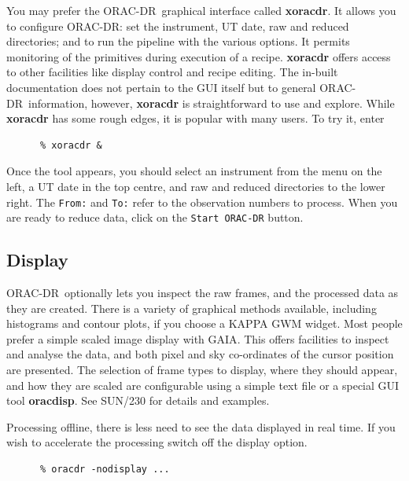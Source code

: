 \documentclass[twoside,11pt]{article}
\newcommand{\htmlref}[2]{#1}
\newcommand{\xref}[3]{#1}
\newcommand{\xlabel}[1]{}
\renewcommand{\_}{\texttt{\symbol{95}}}
\newcommand{\GAIA}{{\footnotesize GAIA}}
\newcommand{\KAPPA}{{\footnotesize KAPPA}}
\newcommand{\ORACDR}{{\footnotesize ORAC-DR}}
\begin{document}
You may prefer the \ORACDR\ graphical interface called 
\xref{{\bf xoracdr}}{sun230}{xoracdr}.
  It allows you to configure
ORAC-DR: set the instrument, UT date, raw and reduced directories; and
to run the pipeline with the various options.  It permits monitoring
of the primitives during execution of a recipe. {\bf xoracdr} offers
access to other facilities like
\htmlref{display control}{display} and recipe editing.  The in-built
documentation does not pertain to the GUI itself but to general
\ORACDR\ information, however, {\bf xoracdr} is straightforward to use
and explore.  While {\bf xoracdr} has some rough edges, it is popular
with many users.  To try it, enter

\begin{verbatim}
      % xoracdr &
\end{verbatim}

Once the tool appears, you should select an instrument from the menu on
the left, a UT date in the top centre, and raw and reduced directories
to the lower right.   The {\tt From:} and {\tt To:} refer to the
observation numbers to process.  When you are ready to reduce data,
click on the {\tt Start ORAC-DR} button.

\subsection{\xlabel{display}Display\label{display}}

\ORACDR\ optionally lets you inspect the raw frames, and the processed
data as they are created.  There is a variety of graphical
methods available, including histograms and contour plots, if you
choose a \xref{\KAPPA}{sun95}{} GWM widget.  Most people prefer a
simple scaled image display with \xref{\GAIA}{sun214}{}.  This offers
facilities to inspect and analyse the data, and both pixel and sky
co-ordinates of the cursor position are presented.  The selection of
frame types to display, where they should appear, and how they are
scaled are configurable using a simple text file or a special GUI tool
{\bf oracdisp}.  See \xref{SUN/230}{sun230}{display_system} for details
and examples.

Processing offline, there is less need to see the data displayed in real time.
If you wish to accelerate the processing switch off the display option.

\begin{verbatim}
      % oracdr -nodisplay ...
\end{verbatim}
\end{document}
